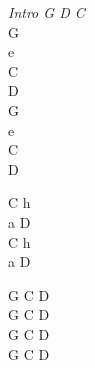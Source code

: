 \begin{chord}
    \textit{Intro G D C}\\
    G\\
    e\\
    C\\
    D\\
    G\\
    e\\
    C\\
    D

    C h\\
    a D\\
    C h\\
    a D

    G C D\\
    G C D\\
    G C D\\
    G C D
\end{chord}